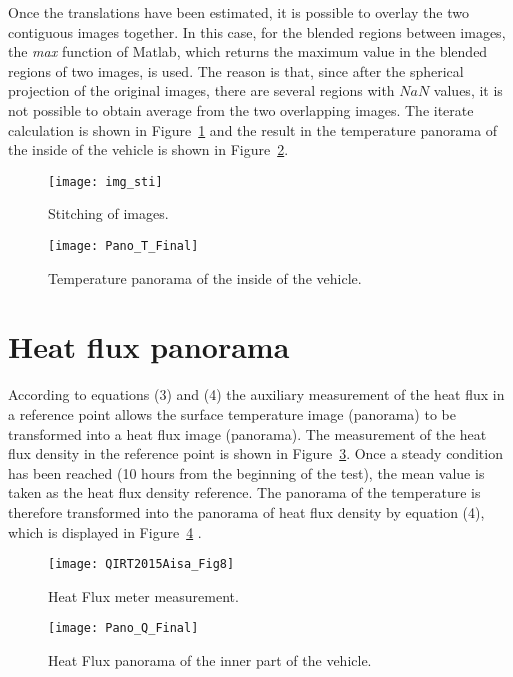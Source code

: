 \documentclass{tQRT2e}
\begin{document}
Once the translations have been estimated, it is possible to overlay the two contiguous images together. In this case, for the blended regions between images, the \textit{max} function of Matlab, which returns the maximum value in the blended regions of two images, is used. The reason is that, since after the spherical projection of the original images, there are several regions with $ NaN $ values, it is not possible to obtain average from the two overlapping images. The iterate calculation is shown in Figure~\ref{img_sti} and the result in the temperature panorama of the inside of the vehicle is shown in Figure~\ref{Pano_T_Final}.
\begin{figure}[ht]
	\centering
	\texttt{[image: img\_sti]}
	\caption{Stitching of images.}
	\label{img_sti}
\end{figure}

\begin{figure}[ht]
	\hspace*{-20pt}
	\texttt{[image: Pano\_T\_Final]}
	\caption{Temperature panorama of the inside of the vehicle.}
	\label{Pano_T_Final}
\end{figure}

\section{Heat flux panorama}
According to equations (3) and (4) the auxiliary measurement of the heat flux in a reference point allows the surface temperature image (panorama) to be transformed into a heat flux image (panorama). The measurement of the heat flux density in the reference point is shown in Figure~\ref{Flux_meter}. Once a steady condition has been reached (10 hours from the beginning of the test), the mean value is taken as the heat flux density reference. The panorama of the temperature is therefore transformed into the panorama of heat flux density by equation (4), which is displayed in Figure~\ref{Pano_Q_Final} . 
\begin{figure}[ht]
	\centering
	\texttt{[image: QIRT2015Aisa\_Fig8]}
	\caption{Heat Flux meter measurement.}
	\label{Flux_meter}
\end{figure}

\begin{figure}[ht]
	\hspace*{-20pt}
	\texttt{[image: Pano\_Q\_Final]}
	\caption{Heat Flux panorama of the inner part of the vehicle.}
	\label{Pano_Q_Final}
\end{figure}
\end{document}
